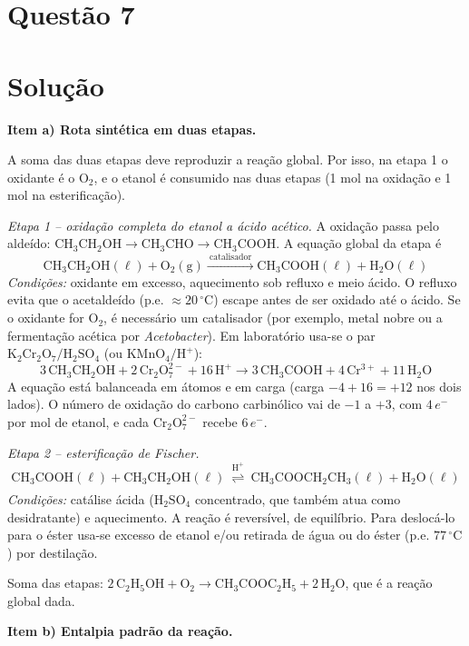 \documentclass{article}%
\begin{document}
\section*{Questão 7}

\section*{Solução}

\textbf{Item a) Rota sintética em duas etapas.}

A soma das duas etapas deve reproduzir a reação global. Por isso, na etapa 1 o oxidante é o $\mathrm{O_2}$, e o etanol é consumido nas duas etapas (1 mol na oxidação e 1 mol na esterificação).

\medskip
\textit{Etapa 1 – oxidação completa do etanol a ácido acético.} A oxidação passa pelo aldeído: $\mathrm{CH_3CH_2OH \rightarrow CH_3CHO \rightarrow CH_3COOH}$. A equação global da etapa é
\[
\mathrm{CH_3CH_2OH(\ell) + O_2(g) \xrightarrow{\ catalisador\ } CH_3COOH(\ell) + H_2O(\ell)}
\]
\emph{Condições:} oxidante em excesso, aquecimento sob refluxo e meio ácido. O refluxo evita que o acetaldeído (p.e. $\approx 20\,^\circ\mathrm{C}$) escape antes de ser oxidado até o ácido. Se o oxidante for $\mathrm{O_2}$, é necessário um catalisador (por exemplo, metal nobre ou a fermentação acética por \textit{Acetobacter}). Em laboratório usa-se o par $\mathrm{K_2Cr_2O_7/H_2SO_4}$ (ou $\mathrm{KMnO_4/H^+}$):
\[
\mathrm{3\,CH_3CH_2OH + 2\,Cr_2O_7^{2-} + 16\,H^+ \rightarrow 3\,CH_3COOH + 4\,Cr^{3+} + 11\,H_2O}
\]
A equação está balanceada em átomos e em carga (carga $-4+16=+12$ nos dois lados). O número de oxidação do carbono carbinólico vai de $-1$ a $+3$, com $4\,e^-$ por mol de etanol, e cada $\mathrm{Cr_2O_7^{2-}}$ recebe $6\,e^-$.

\textit{Etapa 2 – esterificação de Fischer.}
\[
\mathrm{CH_3COOH(\ell) + CH_3CH_2OH(\ell) \ \underset{}{\overset{H^+}{\rightleftharpoons}}\ CH_3COOCH_2CH_3(\ell) + H_2O(\ell)}
\]
\emph{Condições:} catálise ácida ($\mathrm{H_2SO_4}$ concentrado, que também atua como desidratante) e aquecimento. A reação é reversível, de equilíbrio. Para deslocá-lo para o éster usa-se excesso de etanol e/ou retirada de água ou do éster (p.e. $77\,^\circ\mathrm{C}$) por destilação.

Soma das etapas: $\mathrm{2\,C_2H_5OH + O_2 \rightarrow CH_3COOC_2H_5 + 2\,H_2O}$, que é a reação global dada.

\medskip
\textbf{Item b) Entalpia padrão da reação.}
\end{document}
